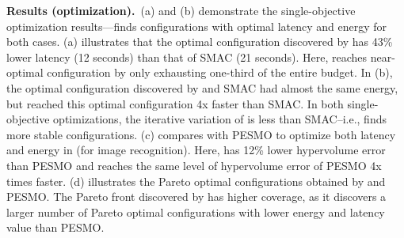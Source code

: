 

\noindent\textbf{Results (optimization).}~(a) and (b) demonstrate the single-objective optimization results---\ourapproach finds configurations with optimal latency and energy for both cases. (a)  illustrates that the optimal configuration discovered by \ourapproach has 43\% lower latency (12 seconds) than that of SMAC (21 seconds). Here, \ourapproach reaches near-optimal configuration by only exhausting one-third of the entire budget. In (b), the optimal configuration discovered by \ourapproach and SMAC had almost the same energy, but \ourapproach reached this optimal configuration 4x faster than SMAC. In both single-objective optimizations, the iterative variation of \ourapproach is less than SMAC--i.e., \ourapproach finds more stable configurations. (c) compares \ourapproach with PESMO to optimize both latency and energy in \txtwo (for image recognition). Here, \ourapproach has 12\% lower hypervolume error than  PESMO and reaches the same level of hypervolume error of PESMO 4x times faster. (d) illustrates the Pareto optimal configurations obtained by \ourapproach and PESMO. The Pareto front discovered by \ourapproach has higher coverage, as it discovers a larger number of Pareto optimal configurations with lower energy and latency value than PESMO.


